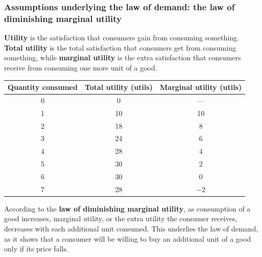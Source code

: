 \documentclass[a4paper,12pt]{article}
\newcommand{\needbold}[1]{\textcolor{red!70!black}{\textbf{#1}}}
\begin{document}
\subsubsection*{Assumptions underlying the law of demand: the law of diminishing marginal utility}
\needbold{Utility} is the satisfaction that consumers gain from consuming something. \\
\needbold{Total utility} is the total satisfaction that consumers get from consuming something, while \needbold{marginal utility} is the extra satisfaction that consumers receive from consuming one more unit of a good.
\begin{center}
\begin{tabular}{c|c|c}
\toprule
\textbf{Quantity consumed} & \textbf{Total utility (utils)} & \textbf{Marginal utility (utils)} \\
\midrule
0 & 0 & --- \\
1 & 10 & 10 \\
2 & 18 & 8 \\
3 & 24 & 6 \\
4 & 28 & 4 \\
5 & 30 & 2 \\
6 & 30 & 0 \\
7 & 28 & $-2$ \\
\bottomrule
\end{tabular}
\end{center}
According to the \needbold{law of diminishing marginal utility}, as consumption of a good increases, marginal utility, or the extra utility the consumer receives, decreases with each additional unit consumed. This underlies the law of demand, as it shows that a consumer will be willing to buy an additional unit of a good only if its price falls.
\end{document}
